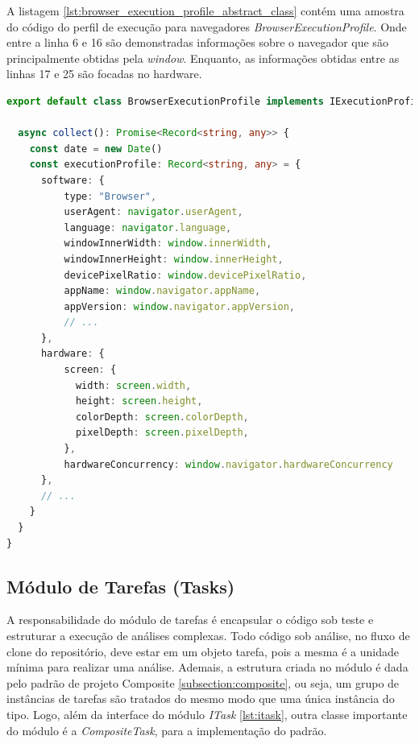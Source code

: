 \documentclass[12pt]{tcc}
\begin{document}
	A listagem \ref{lst:browser_execution_profile_abstract_class} contém uma amostra do código do perfil de execução para navegadores \emph{BrowserExecutionProfile}.
	Onde entre a linha 6 e 16 são demonstradas informações sobre o navegador que são principalmente obtidas pela  \emph{window}.
	Enquanto, as informações obtidas entre as linhas 17 e 25 são focadas no hardware.

\begin{minipage}{\linewidth}
\begin{lstlisting}[label={lst:browser_execution_profile_abstract_class}, caption={[Exemplo de um perfil de execução em navegadores]Fragmento de código da classe \emph{BrowserExecutionProfile} responsável por gerar um perfil de execução em navegadores.}, language=TypeScript, breaklines=true]
export default class BrowserExecutionProfile implements IExecutionProfile {

  async collect(): Promise<Record<string, any>> {
    const date = new Date()
    const executionProfile: Record<string, any> = {
      software: {
          type: "Browser",
          userAgent: navigator.userAgent,
          language: navigator.language,
          windowInnerWidth: window.innerWidth,
          windowInnerHeight: window.innerHeight,
          devicePixelRatio: window.devicePixelRatio,
          appName: window.navigator.appName,
          appVersion: window.navigator.appVersion,
          // ...
      },
      hardware: {
          screen: {
            width: screen.width,
            height: screen.height,
            colorDepth: screen.colorDepth,
            pixelDepth: screen.pixelDepth,
          },
          hardwareConcurrency: window.navigator.hardwareConcurrency
      },
      // ...
    }
  }
}
\end{lstlisting}
\end{minipage}


	\subsection{Módulo de Tarefas (Tasks)}
	\label{subsection:modulo-tasks}

	A responsabilidade do módulo de tarefas é encapsular o código sob teste e estruturar a execução de análises complexas.
	Todo código sob análise, no fluxo de clone do repositório, deve estar em um objeto tarefa, pois a mesma é a unidade mínima para realizar uma análise.
	Ademais, a estrutura criada no módulo é dada pelo padrão de projeto Composite \ref{subsection:composite}, ou seja, um grupo de instâncias de tarefas são tratados do mesmo modo que uma única instância do tipo.
	Logo, além da interface do módulo \emph{ITask} \ref{lst:itask}, outra classe importante do módulo é a \emph{CompositeTask}, para a implementação do padrão.
\end{document}
